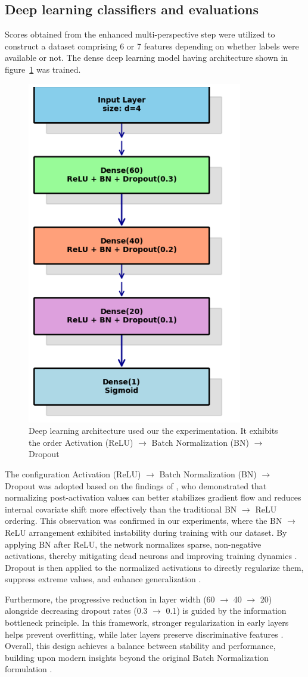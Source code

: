 \documentclass[pdflatex,sn-mathphys-num]{sn-jnl}
\theoremstyle{thmstyleone}
\theoremstyle{thmstyletwo}
\theoremstyle{thmstylethree}
\begin{document}
\subsection{Deep learning classifiers and evaluations}
Scores obtained from the enhanced multi-perspective step were utilized to construct a dataset comprising 6 or 7 features depending on whether labels were available or not. The dense deep learning model having architecture shown in figure~\ref{Deeplearning} was trained.
\begin{figure}[H]
    \centering
\includegraphics[width=0.35\linewidth]{neuro network.png}
    \caption{Deep learning architecture used our the experimentation. It exhibits the order Activation (ReLU) $\rightarrow$ Batch Normalization (BN) $\rightarrow$ Dropout }
    \label{Deeplearning}
\end{figure}
The configuration Activation (ReLU) $\rightarrow$ Batch Normalization (BN) $\rightarrow$ Dropout was adopted based on the findings of \cite{ding2019acnet}, who demonstrated that normalizing post-activation values can better stabilizes gradient flow and reduces internal covariate shift more effectively than the traditional BN $\rightarrow$ ReLU ordering. This observation was confirmed in our experiments, where the BN $\rightarrow$ ReLU arrangement exhibited instability during training with our dataset. By applying BN after ReLU, the network normalizes sparse, non-negative activations, thereby mitigating dead neurons and improving training dynamics \cite{tensorflow_addons2021}. Dropout is then applied to the normalized activations to directly regularize them, suppress extreme values, and enhance generalization \cite{li2019understanding}.

Furthermore, the progressive reduction in layer width (60 $\rightarrow$ 40 $\rightarrow$ 20) alongside decreasing dropout rates (0.3 $\rightarrow$ 0.1) is guided by the information bottleneck principle. In this framework, stronger regularization in early layers helps prevent overfitting, while later layers preserve discriminative features \cite{labach2019survey, rippel2015spectral}. Overall, this design achieves a balance between stability and performance, building upon modern insights beyond the original Batch Normalization formulation \cite{ioffe2015batch}.
\end{document}
